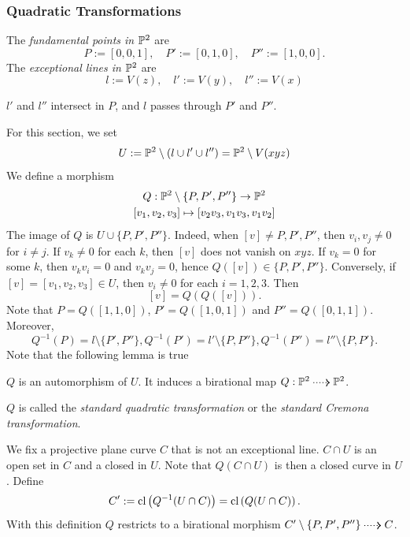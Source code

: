     \subsubsection{Quadratic Transformations}
    \begin{definition}
        The \emph{fundamental points in $\mathbb{P}^2$} are 
        $$
            P := [0,0,1],\quad  P' := [0,1,0],\quad  P'' := [1,0,0].
        $$
        The \emph{exceptional lines in $\mathbb{P}^2$} are 
        $$
            l := V(z),\quad l' := V(y),\quad l'' := V(x)
        $$
    \end{definition}
    \begin{remark}
        $l'$ and $l''$ intersect in $P$, and $l$ passes through $P'$ and $P''$. 
    \end{remark}
    For this section, we set
    $$
        U := \mathbb{P}^2\setminus (l\cup l'\cup l'')=\mathbb{P}^2\setminus V(xyz)
    $$
    We define a morphism 
    \begin{gather*}
        Q: \mathbb{P}^2\setminus\{P,P',P''\} \rightarrow \mathbb{P}^2\\
        [v_1,v_2,v_3]\mapsto [v_2v_3,v_1v_3,v_1v_2]
    \end{gather*}
    The image of $Q$ is $U\cup\{P,P',P''\}$. Indeed, when $[v]\neq P,P',P''$, then $v_i,v_j\neq 0$ for $i\neq j$. If $v_k\neq 0$ for each $k$, then $[v]$ does not vanish on $xyz$. If $v_k=0$ for some $k$, then $v_kv_i=0$ and $v_kv_j = 0$, hence $Q([v])\in \{P,P',P''\}$. Conversely, if $[v]=[v_1,v_2,v_3]\in U$, then $v_i\neq 0$ for each $i=1,2,3$. Then  
    $$
        [v] = Q(Q([v])).
    $$
    Note that $P=Q([1,1,0])$, $P' =Q([1,0,1])$ and $P''=Q([0,1,1])$. Moreover, 
    $$
        Q^{-1}(P)=l\setminus\{P',P''\}, Q^{-1}(P') =l'\setminus\{P,P''\}, Q^{-1}(P'')=l''\setminus\{P,P'\}.
    $$
    Note that the following lemma is true
    \begin{lemma}
        $Q$ is an automorphism of $U$. It induces a birational map $Q:\Pp^2 \dottedarrow \Pp^2$.
    \end{lemma}
    \begin{remark}
        $Q$ is called the \emph{standard quadratic transformation} or the \emph{standard Cremona transformation}.
    \end{remark}
    We fix a projective plane curve $C$ that is not an exceptional line. $ C\cap U$ is an open set in $C$ and a closed in $U$. Note that $Q(C\cap U)$ is then a closed curve in $U$. Define 
    $$
        C' := \mathrm{cl}\left(Q^{-1}(U\cap C)\right)= \mathrm{cl}\left(Q(U\cap C)\right). 
    $$
    With this definition $Q$ restricts to a birational morphism $C'\setminus\{P,P',P''\}\dottedarrow C$. 

